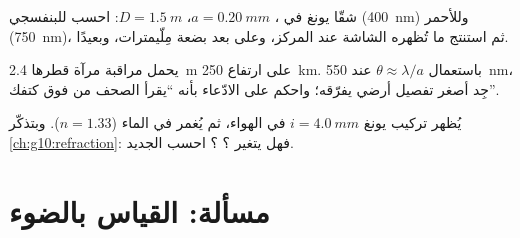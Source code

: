 \begin{exercise}[$\star\star\star$]\label{exo:g12:light-as-wave:13}
شقّا يونغ في ، $a = \qty{0.20}{mm}$، $D = \qty{1.5}{m}$:
احسب  للبنفسجي (\qty{400}{nm}) وللأحمر
(\qty{750}{nm})، ثم استنتج ما تُظهره الشاشة عند المركز، وعلى بعد
بضعة مِلّيمترات، وبعيدًا.
\end{exercise}

\begin{exercise}[$\star\star\star$]\label{exo:g12:light-as-wave:14}
يحمل  مراقبة مرآة قطرها \qty{2.4}{m} على ارتفاع
\qty{250}{km}. باستعمال $\theta \approx \lambda/a$ عند \qty{550}{nm}،
جِد أصغر تفصيل أرضي يفرّقه؛ واحكم على الادّعاء بأنه
``يقرأ الصحف من فوق كتفك''.
\end{exercise}

\begin{exercise}[$\star\star\star$]\label{exo:g12:light-as-wave:15}
يُظهر تركيب يونغ $i = \qty{4.0}{mm}$ في الهواء، ثم يُغمر في
الماء ($n = 1.33$). وبتذكّر \cref{ch:g10:refraction}: فهل يتغير
؟ ؟ احسب  الجديد.
\end{exercise}

\section{مسألة: القياس بالضوء}


